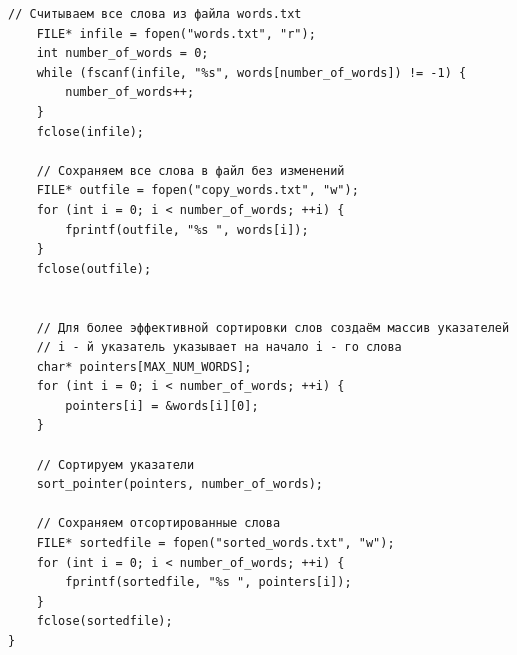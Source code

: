 \documentclass{article}
\begin{document}
\begin{itemize}
\begin{lstlisting}[backgroundcolor = \color{solcolor}]
    // Считываем все слова из файла words.txt
    FILE* infile = fopen("words.txt", "r");
    int number_of_words = 0;
    while (fscanf(infile, "%s", words[number_of_words]) != -1) {
        number_of_words++;
    }
    fclose(infile);
    
    // Сохраняем все слова в файл без изменений
    FILE* outfile = fopen("copy_words.txt", "w");
    for (int i = 0; i < number_of_words; ++i) {
        fprintf(outfile, "%s ", words[i]);
    }
    fclose(outfile);
    
    
    // Для более эффективной сортировки слов создаём массив указателей
    // i - й указатель указывает на начало i - го слова
    char* pointers[MAX_NUM_WORDS];
    for (int i = 0; i < number_of_words; ++i) {
        pointers[i] = &words[i][0];
    }
    
    // Сортируем указатели
    sort_pointer(pointers, number_of_words);
    
    // Сохраняем отсортированные слова
    FILE* sortedfile = fopen("sorted_words.txt", "w");
    for (int i = 0; i < number_of_words; ++i) {
        fprintf(sortedfile, "%s ", pointers[i]);
    }
    fclose(sortedfile);
}
\end{lstlisting}
\end{itemize}
\end{document}
